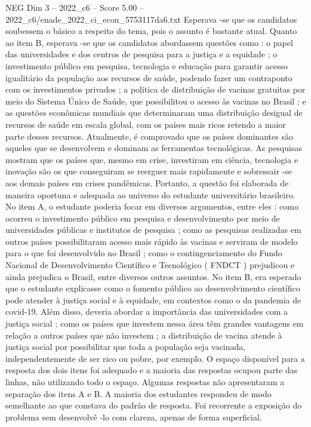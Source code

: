 \begin{textsample}{NEG Dim 3 – 2022\_c6 – Score 5.00 – 2022\_c6/enade\_2022\_ci\_econ\_5753117da6.txt}
Esperava -se que os candidatos soubessem o básico a respeito do tema, pois o assunto é bastante atual.
Quanto ao item B, esperava -se que os candidatos abordassem questões como : o papel das universidades e dos centros de pesquisa para a justiça e a equidade ; o investimento público em pesquisa, tecnologia e educação para garantir acesso igualitário da população aos recursos de saúde, podendo fazer um contraponto com os investimentos privados ; a política de distribuição de vacinas gratuitas por meio do Sistema Único de Saúde, que possibilitou o acesso às vacinas no Brasil ; e as questões econômicas mundiais que determinaram uma distribuição desigual de recursos de saúde em escala global, com os países mais ricos retendo a maior parte desses recursos.
Atualmente, é comprovado que os países dominantes são aqueles que se desenvolvem e dominam as ferramentas tecnológicas.
As pesquisas mostram que os países que, mesmo em crise, investiram em ciência, tecnologia e inovação são os que conseguiram se reerguer mais rapidamente e sobressair -se aos demais países em crises pandêmicas.
Portanto, a questão foi elaborada de maneira oportuna e adequada ao universo do estudante universitário brasileiro.
No item A, o estudante poderia focar em diversos argumentos, entre eles : como ocorreu o investimento público em pesquisa e desenvolvimento por meio de universidades públicas e institutos de pesquisa ; como as pesquisas realizadas em outros países possibilitaram acesso mais rápido às vacinas e serviram de modelo para o que foi desenvolvido no Brasil ; como o contingenciamento do Fundo Nacional de Desenvolvimento Científico e Tecnológico ( FNDCT ) prejudicou e ainda prejudica o Brasil, entre diversos outros assuntos.
No item B, era esperado que o estudante explicasse como o fomento público ao desenvolvimento científico pode atender à justiça social e à equidade, em contextos como o da pandemia de covid-19.
Além disso, deveria abordar a importância das universidades com a justiça social ; como os países que investem nessa área têm grandes vantagens em relação a outros países que não investem ; a distribuição de vacina atende à justiça social por possibilitar que toda a população seja vacinada, independentemente de ser rico ou pobre, por exemplo.
O espaço disponível para a resposta dos dois itens foi adequado e a maioria das respostas ocupou parte das linhas, não utilizando todo o espaço.
Algumas respostas não apresentaram a separação dos itens A e B.
A maioria dos estudantes respondeu de modo semelhante ao que constava do padrão de resposta.
Foi recorrente a exposição do problema sem desenvolvê -lo com clareza, apenas de forma superficial.

\end{textsample}
